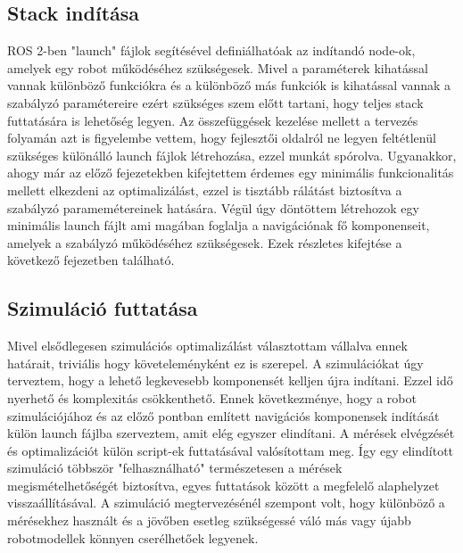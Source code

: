 \subsection{Stack indítása}
ROS 2-ben "launch" fájlok segítésével definiálhatóak az indítandó node-ok, amelyek egy robot működéséhez szükségesek. Mivel a paraméterek kihatással vannak különböző funkciókra és a különböző más funkciók is kihatással vannak a szabályzó paramétereire ezért szükséges szem előtt tartani, hogy teljes stack futtatására is lehetőség legyen. Az összefüggések kezelése mellett a tervezés folyamán azt is figyelembe vettem, hogy fejlesztői oldalról ne legyen feltétlenül szükséges különálló launch fájlok létrehozása, ezzel munkát spórolva. Ugyanakkor, ahogy már az előző fejezetekben kifejtettem érdemes egy minimális funkcionalitás mellett elkezdeni az optimalizálást, ezzel is tisztább rálátást biztosítva a szabályzó paramemétereinek hatására. Végül úgy döntöttem létrehozok egy minimális launch fájlt ami magában foglalja a navigációnak fő komponenseit, amelyek a szabályzó működéséhez szükségesek. Ezek részletes kifejtése a következő fejezetben található.

\subsection{Szimuláció futtatása}
Mivel elsődlegesen szimulációs optimalizálást választottam vállalva ennek határait, triviális hogy követeleményként ez is szerepel. A szimulációkat úgy terveztem, hogy a lehető legkevesebb komponensét kelljen újra indítani. Ezzel idő nyerhető és komplexitás csökkenthető. Ennek következménye, hogy a robot szimulációjához és az előző pontban említett navigációs komponensek indítását külön launch fájlba szerveztem, amit elég egyszer elindítani. A mérések elvégzését és optimalizációt külön script-ek futtatásával valósítottam meg. Így egy elindított szimuláció többször "felhasználható" természetesen a mérések megismételhetőségét biztosítva, egyes futtatások között a megfelelő alaphelyzet visszaállításával. A szimuláció megtervezésénél szempont volt, hogy különböző a mérésekhez használt és a jövőben esetleg szükségessé váló más vagy újabb robotmodellek könnyen cserélhetőek legyenek.

